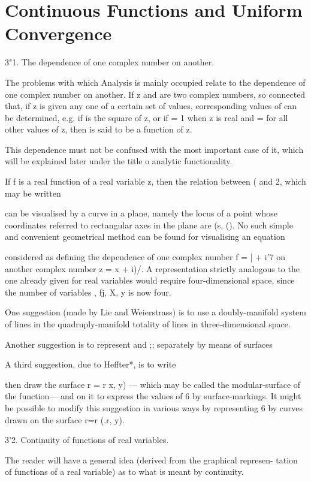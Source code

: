 \chapter{Continuous Functions and Uniform Convergence} 

3"1. The dependence of one complex number on another. 

The problems with which Analysis is mainly occupied relate to the 
dependence of one complex number on another. If z and   are two complex 
numbers, so connected that, if z is given any one of a certain set of values, 
corresponding values of   can be determined, e.g. if   is the square of z, or if 
  = 1 when z is real and   = for all other values of z, then   is said to be a 
function of z. 

This dependence must not be confused with the most important case of 
it, which will be explained later under the title o  analytic functionality. 

If f is a real function of a real variable z, then the relation between ( and 2, which 
may be written 

can be visualised by a curve in a plane, namely the locus of a point whose coordinates 
referred to rectangular axes in the plane are (s, (). No such simple and convenient 
geometrical method can be found for visualising an equation 

considered as defining the dependence of one complex number f = | + i'7 on another 
complex number z = x + i)/. A representation strictly analogous to the one already given 
for real variables would require four-dimensional space, since the number of variables 
 , fj, X, y is now four. 

One suggestion (made by Lie and Weierstrass) is to use a doubly-manifold system of 
lines in the quadruply-manifold totality of lines in three-dimensional space. 

Another suggestion is to represent   and ;; separately by means of surfaces   

A third suggestion, due to Heffter*, is to write 

then draw the surface r = r x, y) — which may be called the modular-surface of the 
function— and on it to express the values of 6 by surface-markings. It might be 
possible to modify this suggestion in various ways by representing 6 by curves drawn 
on the surface r=r (.r, y). 

3'2. Continuity of functions of real variables. 

The reader will have a general idea (derived from the graphical represen- 
tation of functions of a real variable) as to what is meant by continuity. 

